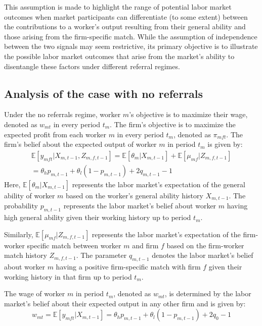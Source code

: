 \documentclass[12pt]{article}
\begin{document}
This assumption is made to highlight the range of potential labor market outcomes when market participants can differentiate (to some extent) between the contributions to a worker's output resulting from their general ability and those arising from the firm-specific match. While the assumption of independence between the two signals may seem restrictive, its primary objective is to illustrate the possible labor market outcomes that arise from the market's ability to disentangle these factors under different referral regimes. 


\subsection{Analysis of the case with no referrals}
Under the no referrals regime, worker $m$'s objective is to maximize their wage, denoted as $w_{mt}$ in every period $t_m$. The firm's objective is to maximize the expected profit from each worker $m$ in every period $t_m$, denoted as $\pi_{mft}$. The firm's belief about the expected output of worker $m$ in period $t_m$ is given by:
\begin{multline}\label{eq:exp_output_NR}
\mathbb{E}[y_{mft} | X_{m,t-1}, Z_{m,f,t-1}] 
= \mathbb{E}[\theta_m | X_{m,t-1}] + \mathbb{E}[\mu_{mf} | Z_{m,f,t-1}] \\
= \theta_h p_{m,t-1} + \theta_l (1-p_{m,t-1}) + 2q_{m,t-1} - 1
\end{multline}
Here, $\mathbb{E}[\theta_m | X_{m,t-1}]$ represents the labor market's expectation of the general ability of worker $m$ based on the worker's general ability history $X_{m,t-1}$. The probability $p_{m,t-1}$ represents the labor market's belief about worker $m$ having high general ability given their working history up to period $t_m$.

Similarly, $\mathbb{E}[\mu_{mf} | Z_{m,f,t-1}]$ represents the labor market's expectation of the firm-worker specific match between worker $m$ and firm $f$ based on the firm-worker match history $Z_{m,f,t-1}$. The parameter $q_{m,t-1}$ denotes the labor market's belief about worker $m$ having a positive firm-specific match with firm $f$ given their working history in that firm up to period $t_m$.

The wage of worker $m$ in period $t_m$, denoted as $w_{mt}$, is determined by the labor market's belief about their expected output in any other firm and is given by:
\begin{equation}\label{eq:w_mt}
w_{mt} = \mathbb{E}[y_{mft} | X_{m,t-1}] = \theta_h p_{m,t-1} + \theta_l (1-p_{m,t-1}) + 2q_0 - 1
\end{equation}
\end{document}
